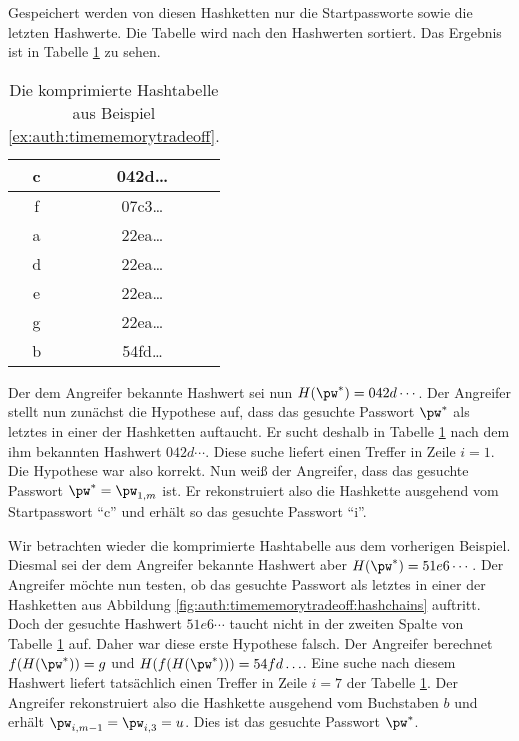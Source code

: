 \begin{beispiel}
Gespeichert werden von diesen Hashketten nur die Startpassworte sowie die letzten Hashwerte. Die Tabelle wird nach den Hashwerten sortiert. Das Ergebnis ist in Tabelle \ref{table:auth:timememorytradeoff:hashtable} zu sehen.

\begin{table}[h]
	\begin{center}
		\begin{tabular}{|c|c|}
			\hline
			c & 042d\ldots\\\hline
			f & 07c3\ldots\\\hline
			a & 22ea\ldots\\\hline
			d & 22ea\ldots\\\hline
			e & 22ea\ldots\\\hline
			g & 22ea\ldots\\\hline
			b & 54fd\ldots\\\hline
		\end{tabular}
	\end{center}
	\caption{Die komprimierte Hashtabelle aus Beispiel \ref{ex:auth:timememorytradeoff}.}
	\label{table:auth:timememorytradeoff:hashtable}
\end{table}

Der dem Angreifer bekannte Hashwert sei nun $H(\pw^*) = 042d\cdots$.
Der Angreifer stellt nun zunächst die Hypothese auf, dass das gesuchte Passwort $\pw^*$ als letztes in einer der Hashketten auftaucht. Er sucht deshalb in Tabelle \ref{table:auth:timememorytradeoff:hashtable} nach dem ihm bekannten Hashwert $042d\cdots$. Diese suche liefert einen Treffer in Zeile $i = 1$. Die Hypothese war also korrekt. Nun weiß der Angreifer, dass das gesuchte Passwort $\pw^* = \pw_{1,m}$ ist. Er rekonstruiert also die Hashkette ausgehend vom Startpasswort "`c"' und erhält so das gesuchte Passwort "`i"'.\\
\end{beispiel}

\begin{beispiel}
Wir betrachten wieder die komprimierte Hashtabelle aus dem vorherigen Beispiel. Diesmal sei der dem Angreifer bekannte Hashwert aber $H(\pw^*) = 51e6\cdots$.
Der Angreifer möchte nun testen, ob das gesuchte Passwort als letztes in einer der Hashketten aus Abbildung \ref{fig:auth:timememorytradeoff:hashchains} auftritt.
Doch der gesuchte Hashwert $51e6\cdots$ taucht nicht in der zweiten Spalte von Tabelle \ref{table:auth:timememorytradeoff:hashtable} auf.
Daher war diese erste Hypothese falsch. Der Angreifer berechnet $f(H(\pw^*)) = g$ und $H(f(H(\pw^*))) = 54fd\ldots$.
Eine suche nach diesem Hashwert liefert tatsächlich einen Treffer in Zeile $i = 7$ der Tabelle \ref{table:auth:timememorytradeoff:hashtable}.
Der Angreifer rekonstruiert also die Hashkette ausgehend vom Buchstaben $b$ und erhält $\pw_{i,m-1} = \pw_{i,3} = u$.
Dies ist das gesuchte Passwort $\pw^*$.\\
\end{beispiel}

